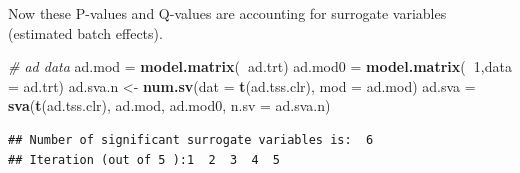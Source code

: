 \documentclass[]{book}
\newenvironment{Shaded}{\begin{snugshade}}{\end{snugshade}}
\newcommand{\KeywordTok}[1]{\textcolor[rgb]{0.13,0.29,0.53}{\textbf{#1}}}
\newcommand{\DataTypeTok}[1]{\textcolor[rgb]{0.13,0.29,0.53}{#1}}
\newcommand{\DecValTok}[1]{\textcolor[rgb]{0.00,0.00,0.81}{#1}}
\newcommand{\StringTok}[1]{\textcolor[rgb]{0.31,0.60,0.02}{#1}}
\newcommand{\CommentTok}[1]{\textcolor[rgb]{0.56,0.35,0.01}{\textit{#1}}}
\newcommand{\OperatorTok}[1]{\textcolor[rgb]{0.81,0.36,0.00}{\textbf{#1}}}
\newcommand{\NormalTok}[1]{#1}
\begin{document}
Now these P-values and Q-values are accounting for surrogate variables
(estimated batch effects).

\begin{Shaded}
\begin{Highlighting}[]
\CommentTok{# ad data}
\NormalTok{ad.mod =}\StringTok{ }\KeywordTok{model.matrix}\NormalTok{(}\OperatorTok{~}\NormalTok{ad.trt)}
\NormalTok{ad.mod0 =}\StringTok{ }\KeywordTok{model.matrix}\NormalTok{(}\OperatorTok{~}\DecValTok{1}\NormalTok{,}\DataTypeTok{data =}\NormalTok{ ad.trt)}
\NormalTok{ad.sva.n <-}\StringTok{ }\KeywordTok{num.sv}\NormalTok{(}\DataTypeTok{dat =} \KeywordTok{t}\NormalTok{(ad.tss.clr), }\DataTypeTok{mod =}\NormalTok{ ad.mod)}
\NormalTok{ad.sva =}\StringTok{ }\KeywordTok{sva}\NormalTok{(}\KeywordTok{t}\NormalTok{(ad.tss.clr), ad.mod, ad.mod0, }\DataTypeTok{n.sv =}\NormalTok{ ad.sva.n)}
\end{Highlighting}
\end{Shaded}

\begin{verbatim}
## Number of significant surrogate variables is:  6 
## Iteration (out of 5 ):1  2  3  4  5
\end{verbatim}

\begin{Shaded}
\end{Shaded}
\end{document}
